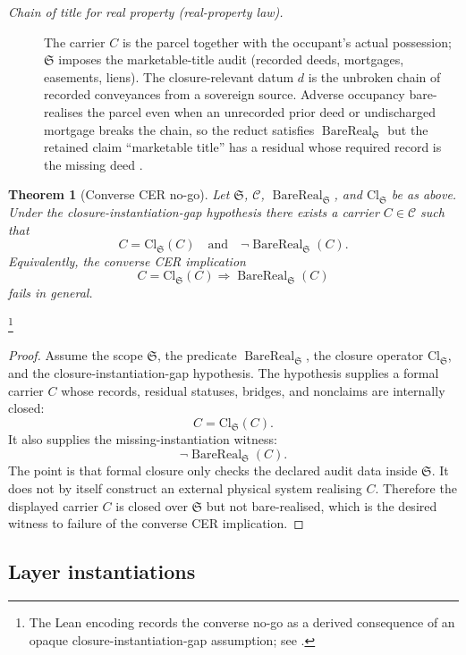 \documentclass[11pt]{article}
\newtheorem{theorem}{Theorem}[section]
\theoremstyle{definition}
\begin{document}
\begin{description}
\item[\emph{Chain of title for real property
(real-property law).}]
The carrier \(C\) is the parcel together with
the occupant's actual possession; \(\mathfrak S\)
imposes the marketable-title audit (recorded
deeds, mortgages, easements, liens).  The
closure-relevant datum \(d\) is the unbroken
chain of recorded conveyances from a sovereign
source.  Adverse occupancy bare-realises the
parcel even when an unrecorded prior deed or
undischarged mortgage breaks the chain, so the
reduct satisfies \(\operatorname{BareReal}
_{\mathfrak S}\) but the retained claim
``marketable title'' has a residual whose
required record is the missing deed
\citep{Palomar2003Patton}.
\end{description}

\begin{theorem}[Converse CER no-go]\label{thm:CER-converse-no-go}
Let \(\mathfrak S\), \(\mathcal C\),
\(\operatorname{BareReal}_{\mathfrak S}\), and
\(\mathrm{Cl}_{\mathfrak S}\) be as above.  Under the
closure-instantiation-gap hypothesis there exists a carrier
\(C\in\mathcal C\) such that
\[
  C=\mathrm{Cl}_{\mathfrak S}(C)
  \quad\text{and}\quad
  \neg\operatorname{BareReal}_{\mathfrak S}(C).
\]
Equivalently, the converse CER implication
\[
  C=\mathrm{Cl}_{\mathfrak S}(C)
  \Longrightarrow
  \operatorname{BareReal}_{\mathfrak S}(C)
\]
fails in general.
\end{theorem}
\footnote{The Lean encoding records the converse no-go as a derived
consequence of an opaque closure-instantiation-gap assumption; see
.}
\begin{proof}
Assume the scope \(\mathfrak S\), the predicate
\(\operatorname{BareReal}_{\mathfrak S}\), the closure operator
\(\mathrm{Cl}_{\mathfrak S}\), and the closure-instantiation-gap
hypothesis.  The hypothesis supplies a formal carrier \(C\) whose
records, residual statuses, bridges, and nonclaims are internally
closed:
\[
  C=\mathrm{Cl}_{\mathfrak S}(C).
\]
It also supplies the missing-instantiation witness:
\[
  \neg\operatorname{BareReal}_{\mathfrak S}(C).
\]
The point is that formal closure only checks the declared audit data
inside \(\mathfrak S\).  It does not by itself construct an external
physical system realising \(C\).  Therefore the displayed carrier
\(C\) is closed over \(\mathfrak S\) but not bare-realised, which is
the desired witness to failure of the converse CER implication.
\end{proof}

\subsection*{Layer instantiations}\label{layer-inst:CER-converse}
\end{document}
